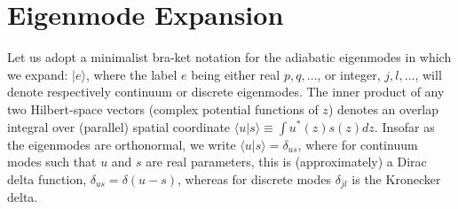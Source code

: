 \documentclass[12pt]{article}
\def\ket#1{|#1\rangle}
\def\bra#1{\langle#1}
\begin{document}
\section{Eigenmode Expansion}
Let us adopt a minimalist bra-ket notation for the adiabatic
eigenmodes in which we expand: $\ket{e}$, where the label $e$ being
either real $p,q,\dots$, or integer, $j,l,\dots$, will denote
respectively continuum or discrete eigenmodes. The inner product of
any two Hilbert-space vectors (complex potential functions of $z$)
denotes an overlap integral over (parallel) spatial coordinate
$\bra{u}\ket{s}\equiv \int u^*(z)s(z)dz$. Insofar as the eigenmodes
are orthonormal, we write $\bra{u}\ket{s}=\delta_{us}$, where for
continuum modes such that $u$ and $s$ are real parameters, this is
(approximately) a Dirac delta function, $\delta_{us}=\delta(u-s)$,
whereas for discrete modes $\delta_{jl}$ is the Kronecker delta.
\end{document}
